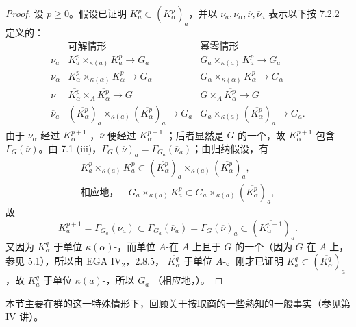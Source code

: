 \begin{proof}
设 $p\geq0$。假设已证明 $K_a^p\subset(\overline{K_\alpha^p})_a$，并以 $\nu_a,\nu_\alpha,\overline\nu,\overline\nu_a$ 表示以下按 7.2.2 定义的：
\[
\begin{array}{c|c|c}
&\text{可解情形}&\text{幂零情形}\\ \hline
\nu_a&K_a^p\times_{\kappa(a)}K_a^p\to G_a
&G_a\times_{\kappa(a)}K_a^p\to G_a\\
\nu_\alpha&K_\alpha^p\times_{\kappa(\alpha)}K_\alpha^p\to G_\alpha
&G_\alpha\times_{\kappa(\alpha)}K_\alpha^p\to G_\alpha\\
\overline\nu&\overline{K_\alpha^p}\times_A\overline{K_\alpha^p}\to G
&G\times_A\overline{K_\alpha^p}\to G\\
\overline\nu_a&(\overline{K_\alpha^p})_a\times_{\kappa(a)}(\overline{K_\alpha^p})_a\to G_a
&G_a\times_{\kappa(a)}(\overline{K_\alpha^p})_a\to G_a.
\end{array}
\]
由于 $\nu_\alpha$ 经过 $K_\alpha^{p+1}$ ，$\overline\nu$ 便经过 $\overline{K_\alpha^{p+1}}$ ；后者显然是 $G$ 的一个，故 $\overline{K_\alpha^{p+1}}$ 包含 $\Gamma_G(\overline\nu)$。由 7.1 (iii)，$\Gamma_G(\overline\nu)_a=\Gamma_{G_a}(\overline\nu_a)$；由归纳假设，有
\[
\begin{gathered}
K_a^p\times_{\kappa(a)}K_a^p
\subset(\overline{K_\alpha^p})_a\times_{\kappa(a)}(\overline{K_\alpha^p})_a,\\
\text{相应地，}\quad
G_a\times_{\kappa(a)}K_a^p\subset G_a\times_{\kappa(a)}(\overline{K_\alpha^p})_a,
\end{gathered}
\]
故
\[
K_a^{p+1}=\Gamma_{G_a}(\nu_a)\subset\Gamma_{G_a}(\overline\nu_a)
=\Gamma_G(\overline\nu)_a\subset(\overline{K_\alpha^{p+1}})_a.
\]
又因为 $K_\alpha^q$ 于单位 $\kappa(\alpha)$-，而单位 $A$-在 $A$ 上且于 $G$ 的一个（因为 $G$ 在 $A$ 上，参见 5.1），所以由 EGA $\mathrm{IV}_2$，2.8.5， $\overline{K_\alpha^q}$ 于单位 $A$-。刚才已证明 $K_a^q\subset(\overline{K_\alpha^q})_a$，故 $K_a^q$ 于单位 $\kappa(a)$-，所以 $G_a$ （相应地，）。
\end{proof}

本节主要在群的这一特殊情形下，回顾关于按取商的一些熟知的一般事实（参见第 IV 讲）。

